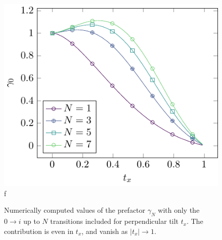 \documentclass{scrarticle}
\begin{document}
\begin{figure}[p]
  \centering
  \includegraphics[width=\textwidth]{../Thesis/figures/external/contribtx-zerothll}
  f
  \caption{Numerically computed values of the prefactor \( \gamma_N \) with only the \( 0 \to i \) up to \( N \) transitions included for perpendicular tilt \( t_x \).
    The contribution is even in \( t_x \), and vanish as \( |t_x| \to 1 \).
    \label{fig:zerothll}
  }
\end{figure}
\end{document}

